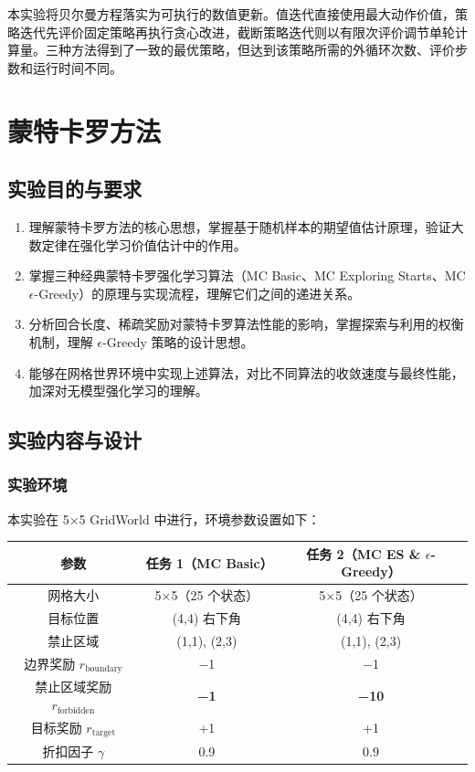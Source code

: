 \documentclass[11pt,a4paper,UTF8]{ctexart}
\numberwithin{figure}{section}
\numberwithin{table}{section}
\newcommand{\goalstar}{\ding{72}}
\begin{document}
本实验将贝尔曼方程落实为可执行的数值更新。值迭代直接使用最大动作价值，策略迭代先评价固定策略再执行贪心改进，截断策略迭代则以有限次评价调节单轮计算量。三种方法得到了一致的最优策略，但达到该策略所需的外循环次数、评价步数和运行时间不同。

\newpage
\section{蒙特卡罗方法}
\subsection{实验目的与要求}

\begin{enumerate}
\item 理解蒙特卡罗方法的核心思想，掌握基于随机样本的期望值估计原理，验证大数定律在强化学习价值估计中的作用。
\item 掌握三种经典蒙特卡罗强化学习算法（MC Basic、MC Exploring Starts、MC $\epsilon$-Greedy）的原理与实现流程，理解它们之间的递进关系。
\item 分析回合长度、稀疏奖励对蒙特卡罗算法性能的影响，掌握探索与利用的权衡机制，理解 $\epsilon$-Greedy 策略的设计思想。
\item 能够在网格世界环境中实现上述算法，对比不同算法的收敛速度与最终性能，加深对无模型强化学习的理解。
\end{enumerate}
\subsection{实验内容与设计}

\subsubsection{实验环境}

本实验在 5×5 GridWorld 中进行，环境参数设置如下：

\begin{table}[H]
\centering
\begin{tabular}{ccc}
\toprule
参数 & 任务 1（MC Basic） & 任务 2（MC ES \& $\epsilon$-Greedy） \\
\midrule
网格大小 & 5×5（25 个状态） & 5×5（25 个状态） \\
目标位置 & (4,4) 右下角 \goalstar & (4,4) 右下角 \goalstar \\
禁止区域 & (1,1), (2,3) & (1,1), (2,3) \\
边界奖励 $r_\text{boundary}$ & −1 & −1 \\
禁止区域奖励 $r_\text{forbidden}$ & \textbf{−1} & \textbf{−10} \\
目标奖励 $r_\text{target}$ & +1 & +1 \\
折扣因子 $\gamma$ & 0.9 & 0.9 \\
\bottomrule
\end{tabular}
\end{table}
\end{document}
